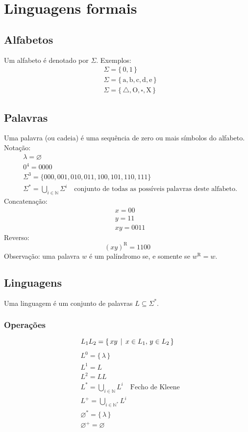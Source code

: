 \documentclass[11pt]{article}
\date{\today}
\title{}
\begin{document}
\section{Linguagens formais}
\label{sec:org700ee4f}
\subsection{Alfabetos}
\label{sec:orgd0d5410}
Um alfabeto é denotado por \(\Sigma\). Exemplos:
\begin{align*}
  & \Sigma = \{\, 0, 1 \,\} \\
  & \Sigma = \{\, \text{a}, \text{b}, \text{c}, \text{d}, \text{e} \,\} \\
  & \Sigma = \{\, \triangle, \text{O}, \square, \text{X} \,\}
\end{align*}
\subsection{Palavras}
\label{sec:org06083bf}
Uma palavra (ou cadeia) é uma sequência de zero ou mais símbolos do alfabeto.
\\[5pt]
Notação:
\begin{align*}
  & \lambda = \varnothing \\
  & 0^4 = 0000 \\
  & \Sigma^3 = \{ 000, 001, 010, 011, 100, 101, 110, 111 \} \\
  & \Sigma^* = \bigcup_{i \in \mathbb{N}} \Sigma^i \quad \text{conjunto de todas as possíveis palavras deste alfabeto.}
\end{align*}
Concatenação:
\begin{align*}
  & x = 00 \\
  & y = 11 \\
  & xy = 0011
\end{align*}
Reverso:
\[
  (xy)^{\text{R}} = 1100
\]
Observação: uma palavra \(w\) é um palíndromo se, e somente se \(w^{\text{R}} = w\).
\subsection{Linguagens}
\label{sec:org04ab6ee}
Uma linguagem é um conjunto de palavras \(L \subseteq \Sigma^*\).
\subsubsection{Operações}
\label{sec:orgaf180bd}
\[ L_1L_2 = \{\, xy \,\mid\, x \in L_1,\, y \in L_2 \,\} \\ \]
\begin{align*}
  & L^0 = \{\, \lambda \,\} \\
  & L^1 = L \\
  & L^2 = LL \\
  & L^* = \bigcup_{i \in \mathbb{N}} L^i \quad \text{Fecho de Kleene} \\
  & L^+ = \bigcup_{i \in \mathbb{N}^*} L^i \\
  & \varnothing^* = \{\, \lambda \,\} \\
  & \varnothing^+ = \varnothing
\end{align*}
\end{document}
